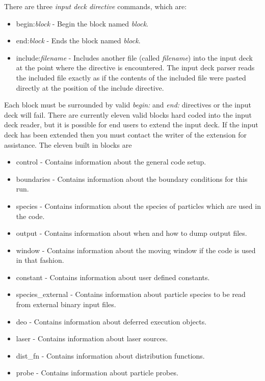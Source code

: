 \documentclass[12pt,a4paper]{article}
\begin{document}
There are three {\it input deck directive} commands, which are:
\begin{itemize}
\item begin:{\it block} - Begin the block named {\it block}.
\item end:{\it block} - Ends the block named {\it block}.
\item include:{\it filename} - Includes another file (called {\it filename})
  into the input deck at the point where the directive is encountered. The
  input deck parser reads the included file exactly as if the contents of the
  included file were pasted directly at the position of the include directive.
\end{itemize}
Each block must be surrounded by valid {\it begin:} and {\it end:} directives
or the input deck will fail. There are currently eleven valid blocks hard
coded into the input deck reader, but it is possible for end users to extend the
input deck. If the input deck has been extended then you must contact the
writer of the extension for assistance. The eleven built in blocks are
\begin{itemize}
\item control - Contains information about the general code setup.
\item boundaries - Contains information about the boundary conditions for this
  run.
\item species - Contains information about the species of particles which are
  used in the code.
\item output - Contains information about when and how to dump output files.
\item window - Contains information about the moving window if the code is
  used in that fashion.
\item constant - Contains information about user defined constants.
\item species\_external - Contains information about particle species to be
  read from external binary input files.
\item deo - Contains information about deferred execution objects.
\item laser - Contains information about laser sources.
\item dist\_fn - Contains information about distribution functions.
\item probe - Contains information about particle probes.
\end{itemize}
\end{document}
